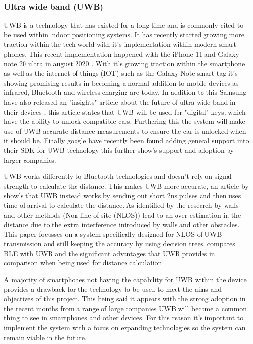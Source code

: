 \subsubsection{Ultra wide band (UWB)}
UWB is a technology that has existed for a long time and is commonly cited to be used within indoor positioning systems. It has recently started growing more traction within the tech world with it's implementation within modern smart phones. This recent implementation happened with the iPhone 11 and Galaxy note 20 ultra in august 2020 \cite{vyas_2021_google}. With it's growing traction within the smartphone as well as the internet of things (IOT) such as the Galaxy Note smart-tag \cite{samsung_2021_introducing} it's showing promising results in becoming a normal addition to mobile devices as infrared, Bluetooth and wireless charging are today. In addition to this Samsung have also released an "insights" article about the future of ultra-wide band in their devices \cite{samsung_2021_what}, this article states that UWB will be used for "digital" keys, which have the ability to unlock compatible cars. Furthering this the system will make use of UWB accurate distance measurements to ensure the car is unlocked when it should be. Finally google have recently been found adding general support into their SDK for UWB technology \cite{vyas_2021_google} this further show's support and adoption by larger companies. 

UWB works differently to Bluetooth technologies and doesn't rely on signal strength to calculate the distance. This makes UWB more accurate, an article by \cite{connell_2015_stackpath} show's that UWB instead works by sending out short 2ns pulses and then uses time of arrival to calculate the distance. As identified by the research by \cite{musa_2019_a} walls and other methods (Non-line-of-site (NLOS)) lead to an over estimation in the distance due to the extra interference introduced by walls and other obstacles. This paper focusses on a system specifically designed for NLOS of UWB transmission and still keeping the accuracy by using decision trees. \cite{comer_uwb_vs_ble} compares BLE with UWB and the significant advantages that UWB provides in comparison when being used for distance calculation 

A majority of smartphones not having the capability for UWB within the device provides a drawback for the technology to be used to meet the aims and objectives of this project. This being said it appears with the strong adoption in the recent months from a range of large companies UWB will become a common thing to see in smartphones and other devices. For this reason it's important to implement the system with a focus on expanding technologies so the system can remain viable in the future.\\

